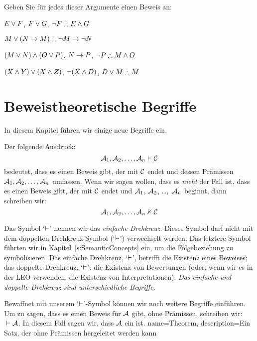\problempart 
Geben Sie für jedes dieser Argumente einen Beweis an:
\begin{earg}
\item $E\vee F$, $F\vee G$, $\enot F \therefore E \eand G$
\item $M\eor(N\eif M) \therefore \enot M \eif \enot N$
\item $(M \vee N) \wedge (O \vee P)$, $N \rightarrow P$, $\enot P \therefore M\eand O$
\item $(X\wedge Y)\vee(X\wedge Z)$, $\neg(X\wedge D)$, $D\eor M \therefore M$
\end{earg}



\chapter{Beweistheoretische Begriffe}\label{s:ProofTheoreticConcepts}

In diesem Kapitel führen wir einige neue Begriffe ein.

Der folgende Ausdruck:
$$\mathcal{A}_1, \mathcal{A}_2, \ldots, \mathcal{A}_n \vdash \mathcal{C}$$
bedeutet, dass es einen Beweis gibt, der mit $\mathcal{C}$ endet und dessen Prämissen $\mathcal{A}_1, \mathcal{A}_2, \ldots, \mathcal{A}_n$ umfassen. Wenn wir sagen wollen, dass es \emph{nicht} der Fall ist, dass es einen Beweis gibt, der mit $\mathcal{C}$ endet und $\mathcal{A}_1$, $\mathcal{A}_2$, \dots,~$\mathcal{A}_n$ beginnt, dann schreiben wir: 
$$\mathcal{A}_1, \mathcal{A}_2, \ldots, \mathcal{A}_n \nvdash \mathcal{C}$$ 

Das Symbol `$\vdash$' nennen wir das \emph{einfache Drehkreuz}. Dieses Symbol darf nicht mit dem doppelten Drehkreuz-Symbol (`$\vDash$') verwechselt werden. Das letztere Symbol führten wir in Kapitel~\ref{s:SemanticConcepts} ein, um die Folgebeziehung zu symbolisieren. Das einfache Drehkreuz, `$\vdash$', betrifft die Existenz eines Beweises; das doppelte Drehkreuz, `$\vDash$', die Existenz von Bewertungen (oder, wenn wir es in der LEO verwenden, die Existenz von Interpretationen). \emph{Das einfache und doppelte Drehkreuz sind unterschiedliche Begriffe.}

Bewaffnet mit unserem `$\vdash$'-Symbol können wir noch weitere Begriffe einführen. Um zu sagen, dass es einen Beweis für $\mathcal{A}$ gibt, ohne Prämissen, schreiben wir: ${} \vdash \mathcal{A}$. In diesem Fall sagen wir, dass $\mathcal{A}$ ein  ist.
{
name=Theorem,
description={Ein Satz, der ohne Prämissen hergeleitet werden kann}
}

